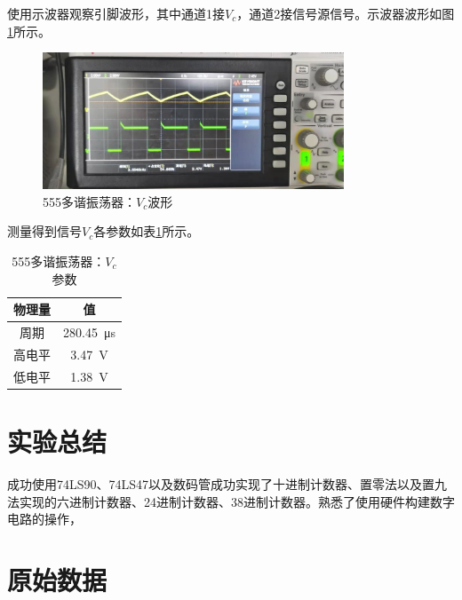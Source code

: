 \documentclass[UTF8]{ctexart}
\numberwithin{figure}{subsection}
\numberwithin{table}{subsection}
\numberwithin{equation}{subsection}
\begin{document}
\par 使用示波器观察引脚波形，其中通道1接\(V_c\)，通道2接信号源信号。示波器波形如图\ref{multiosci vc osci}所示。

\begin{figure}[H]
    \begin{center}
        \includegraphics[width=0.8\textwidth]{555/multiosci/vc.jpg}
    \end{center}
    \caption{555多谐振荡器：\(V_c\)波形}
    \label{multiosci vc osci}
\end{figure}

测量得到信号\(V_c\)各参数如表\ref{multiosci vc table}所示。

\begin{table}
    \begin{center}
        \begin{tabular}{c | c}
            物理量 & 值 \\
            \hline
            周期 & \SI{280.45}{\micro\second} \\
            高电平 & \SI{3.47}{\volt} \\
            低电平 & \SI{1.38}{\volt} \\
        \end{tabular}
        \label{multiosci vc table}
        \caption{555多谐振荡器：\(V_c\)参数}
    \end{center}
\end{table}





\section{实验总结}

成功使用74LS90、74LS47以及数码管成功实现了十进制计数器、置零法以及置九法实现的六进制计数器、24进制计数器、38进制计数器。熟悉了使用硬件构建数字电路的操作，

\section*{原始数据}
\end{document}
